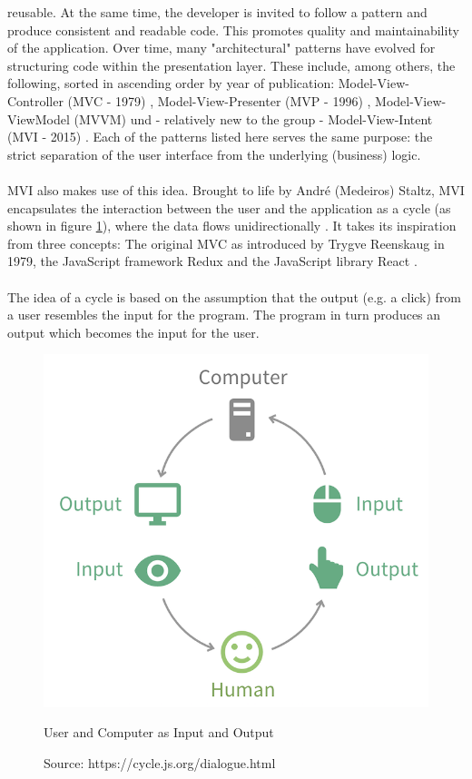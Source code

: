 reusable. At the same time, the developer is invited to follow a pattern and produce consistent and readable code. This promotes quality and
maintainability of the application. Over time, many "architectural" patterns have evolved for structuring code within the presentation layer. 
These include, among others, the following, sorted in ascending order by year of publication: Model-View-Controller (MVC - 1979) 
\cite{theModelViewEditorTrygveReenskaug1979,modelsViewsControllersTrygveReenskaug1979,aDescriptionOfTheModelViewControllerGlennE1988,professionalASPNETMVC52014}, 
Model-View-Presenter (MVP - 1996) 
\cite{mVPModelViewPresenterTheTaligentMikePotel1996,modelViewPresenterMartinFowler2006,proAspNetMVC3FrameworkModelViewPresenter2011},
Model-View-ViewModel (MVVM) 
\cite{introductionToModelViewModelPatternJohnGossman2005, modelViewViewModelDesignPatternUsingWindowsErikSorenson2010,proAspNetMVC3FrameworkModelViewPresenter2011}
und - relatively new to the group - Model-View-Intent (MVI - 2015) 
\cite{whatIfTheUserWasAFunctionYoutubeAndreStaltzUserFunction2015,reactiveProgrammingWithRxJSMVISergiMansilla,modelViewIntentOnAndroidHannesDorfmann2016}. 
Each of the patterns listed here serves the same purpose: the strict separation of the user interface from the underlying (business) logic.
\\
\\
MVI also makes use of this idea. Brought to life by André (Medeiros) Staltz, MVI encapsulates the interaction between the user and the application as a cycle 
(as shown in figure 
\ref{fig:userComputerInputOutput}), 
where the data flows unidirectionally 
\cite{unidirectionalDataFlowFluxArchitectureIlyGelman2017,unidirectionalDataFlowTamingTheStateinReactRobinWieruch2018,unidirectionalDataFlowTheCompleteReduxBookIlyGelman2017}.
It takes its inspiration from three concepts: The original MVC as introduced by Trygve Reenskaug in 1979, the JavaScript framework Redux 
\cite{reduxReduxQuickStartGuidJamesLee2019} 
and the JavaScript library React 
\cite{reactJSReactJsAnOpenSourceNaimulIslamNaim2017}.
\\
\\
The idea of a cycle is based on the assumption that the output (e.g. a click) from a user resembles the input for the program. The program in turn produces an output 
which becomes the input for the user.
\begin{figure}[ht]
    \centering
    \includegraphics[height=0.5\textwidth]{./images/mvi-cycle}
    \caption{User and Computer as Input and Output}
    \caption*{Source: https://cycle.js.org/dialogue.html}
    \label{fig:userComputerInputOutput}
\end{figure}
